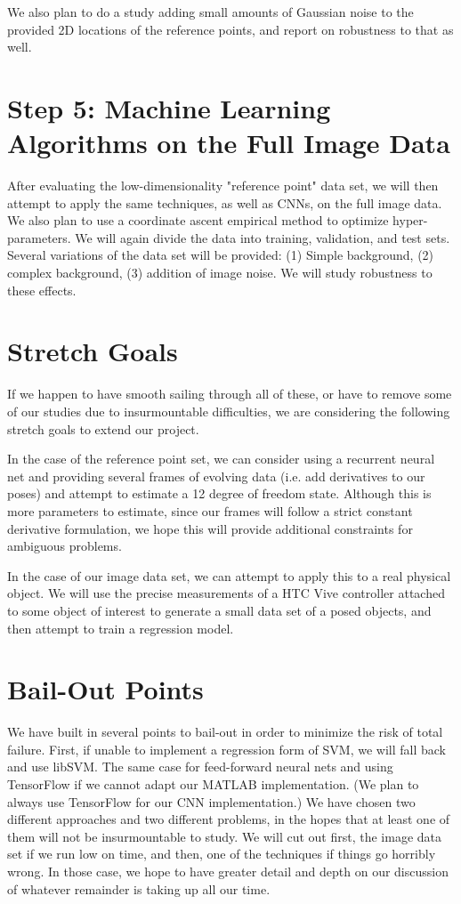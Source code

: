 \documentclass[journal]{IEEEtran}
\begin{document}
We also plan to do a study adding small amounts of Gaussian noise to the provided 2D locations of the reference points, and report on robustness to that as well.

\section{Step 5: Machine Learning Algorithms on the Full Image Data}

After evaluating the low-dimensionality "reference point" data set, we will then attempt to apply the same techniques, as well as CNNs, on the full image data.
We also plan to use a coordinate ascent empirical method to optimize hyper-parameters. We will again divide the data into training, validation, and test sets.
Several variations of the data set will be provided: (1) Simple background, (2) complex background, (3) addition of image noise. We will study robustness to these 
effects.

\section{Stretch Goals}
If we happen to have smooth sailing through all of these, or have to remove some of our studies due to insurmountable difficulties, we are considering the following
stretch goals to extend our project.

In the case of the reference point set, we can consider using a recurrent neural net and providing several frames of evolving data (i.e. add derivatives to our poses) and
attempt to estimate a 12 degree of freedom state. Although this is more parameters to estimate, since our frames will follow a strict constant derivative formulation, we hope
this will provide additional constraints for ambiguous problems.

In the case of our image data set, we can attempt to apply this to a real physical object. We will use the precise measurements of a HTC Vive controller attached to some object
of interest to generate a small data set of a posed objects, and then attempt to train a regression model.

\section{Bail-Out Points}
We have built in several points to bail-out in order to minimize the risk of total failure. First, if unable to implement a regression form of SVM, we will fall back and use libSVM. The same case for
feed-forward neural nets and using TensorFlow if we cannot adapt our MATLAB implementation. (We plan to always use TensorFlow for our CNN implementation.) We have chosen two different
approaches and two different problems, in the hopes that at least one of them will not be insurmountable to study. We will cut out first, the image data set if we run low on time, and then, one of
the techniques if things go horribly wrong. In those case, we hope to have greater detail and depth on our discussion of whatever remainder is taking up all our time.
\end{document}
